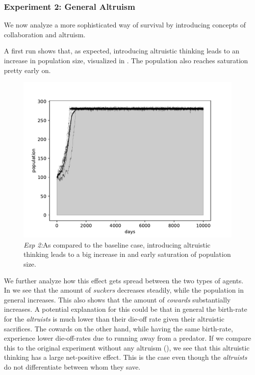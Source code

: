 \documentclass[sigconf]{acmart}
\newcommand{\todo}[1]{{\color{red}{#1}}}
\newcommand{\cowards}{\textit{cowards}\xspace}
\newcommand{\altruists}{\textit{altruists}\xspace}
\newcommand{\suckers}{\textit{suckers}\xspace}
\begin{document}
    \subsubsection*{Experiment 2: General Altruism}

    We now analyze a more sophisticated way of survival by introducing concepts of collaboration and altruism.

    A first run shows that, as expected, introducing altruistic thinking leads to an increase in population size, visualized in .
    The population also reaches saturation pretty early on.

    \begin{figure}
        \includegraphics[width=\columnwidth]{figures/alt_cow_increase_total}
        \caption{\textit{Exp 2:}As compared to the baseline case, introducing altruistic thinking leads to a big increase in and early saturation of population size.
        }
        \label{fig:alt_cow_total}
    \end{figure}

    We further analyze how this effect gets spread between the two types of agents.
    In  we see that the amount of \suckers decreases steadily, while the population in general increases.
    This also shows that the amount of \cowards substantially increases.
    A potential explanation for this could be that in general the birth-rate for the \altruists is much lower than their die-off rate given their altruistic sacrifices.
    The cowards on the other hand, while having the same birth-rate, experience lower die-off-rates due to running away from a predator.
    If we compare this to the original experiment without any altruism (), we see that this altruistic thinking has a large net-positive effect.
    This is the case even though the \altruists do not differentiate between whom they save.
\end{document}
